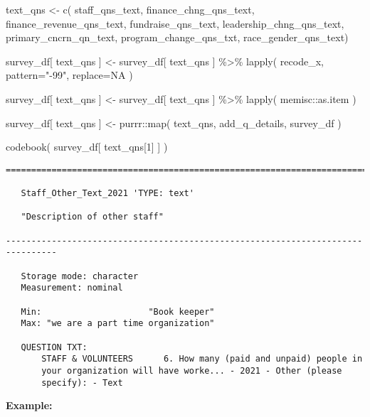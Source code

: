 \documentclass[
  letterpaper,
]{scrbook}
\newenvironment{Shaded}{\begin{snugshade}}{\end{snugshade}}
\newcommand{\AttributeTok}[1]{\textcolor[rgb]{0.40,0.45,0.13}{#1}}
\newcommand{\ConstantTok}[1]{\textcolor[rgb]{0.56,0.35,0.01}{#1}}
\newcommand{\DecValTok}[1]{\textcolor[rgb]{0.68,0.00,0.00}{#1}}
\newcommand{\FunctionTok}[1]{\textcolor[rgb]{0.28,0.35,0.67}{#1}}
\newcommand{\NormalTok}[1]{\textcolor[rgb]{0.00,0.23,0.31}{#1}}
\newcommand{\OtherTok}[1]{\textcolor[rgb]{0.00,0.23,0.31}{#1}}
\newcommand{\SpecialCharTok}[1]{\textcolor[rgb]{0.37,0.37,0.37}{#1}}
\newcommand{\StringTok}[1]{\textcolor[rgb]{0.13,0.47,0.30}{#1}}
\begin{document}
\begin{Shaded}
\begin{Highlighting}[]
\NormalTok{text\_qns }\OtherTok{\textless{}{-}} 
  \FunctionTok{c}\NormalTok{( staff\_qns\_text, }
\NormalTok{     finance\_chng\_qns\_text, }
\NormalTok{     finance\_revenue\_qns\_text, }
\NormalTok{     fundraise\_qns\_text, }
\NormalTok{     leadership\_chng\_qns\_text, }
\NormalTok{     primary\_cncrn\_qn\_text, }
\NormalTok{     program\_change\_qns\_txt, }
\NormalTok{     race\_gender\_qns\_text)}

\NormalTok{survey\_df[ text\_qns ] }\OtherTok{\textless{}{-}} 
\NormalTok{  survey\_df[ text\_qns ] }\SpecialCharTok{\%\textgreater{}\%}
  \FunctionTok{lapply}\NormalTok{( recode\_x, }\AttributeTok{pattern=}\StringTok{"{-}99"}\NormalTok{, }\AttributeTok{replace=}\ConstantTok{NA}\NormalTok{ )}

\NormalTok{survey\_df[ text\_qns ] }\OtherTok{\textless{}{-}} 
\NormalTok{  survey\_df[ text\_qns ] }\SpecialCharTok{\%\textgreater{}\%}
  \FunctionTok{lapply}\NormalTok{( memisc}\SpecialCharTok{::}\NormalTok{as.item )}

\NormalTok{survey\_df[ text\_qns ] }\OtherTok{\textless{}{-}}\NormalTok{ purrr}\SpecialCharTok{::}\FunctionTok{map}\NormalTok{( text\_qns, add\_q\_details, survey\_df )}

\FunctionTok{codebook}\NormalTok{( survey\_df[ text\_qns[}\DecValTok{1}\NormalTok{] ] )}
\end{Highlighting}
\end{Shaded}

\begin{verbatim}
================================================================================

   Staff_Other_Text_2021 'TYPE: text'

   "Description of other staff"

--------------------------------------------------------------------------------

   Storage mode: character
   Measurement: nominal

   Min:                     "Book keeper"
   Max: "we are a part time organization"

   QUESTION TXT:
       STAFF & VOLUNTEERS      6. How many (paid and unpaid) people in
       your organization will have worke... - 2021 - Other (please
       specify): - Text
\end{verbatim}

\textbf{Example:}
\end{document}

